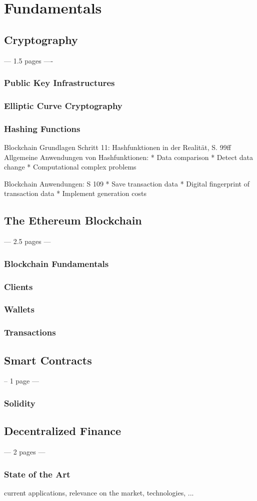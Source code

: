 \chapter{Fundamentals}
\label{cha:Fundamentals}

\section{Cryptography}
--- 1.5 pages ----
\subsection{Public Key Infrastructures}
\subsection{Elliptic Curve Cryptography}
\subsection{Hashing Functions}
Blockchain Grundlagen
Schritt 11: Hashfunktionen in der Realität, S. 99ff
Allgemeine Anwendungen von Hashfunktionen:
* Data comparison
* Detect data change
* Computational complex problems

Blockchain Anwendungen: S 109
* Save transaction data
* Digital fingerprint of transaction data
* Implement generation costs

\section{The Ethereum Blockchain}
--- 2.5 pages ---
\subsection{Blockchain Fundamentals}
\subsection{Clients}
\subsection{Wallets}
\subsection{Transactions}
\section{Smart Contracts}
-- 1 page ---
\subsection{Solidity}
\section{Decentralized Finance}
--- 2 pages ---
\subsection{State of the Art}
current applications, relevance on the market, technologies, ...